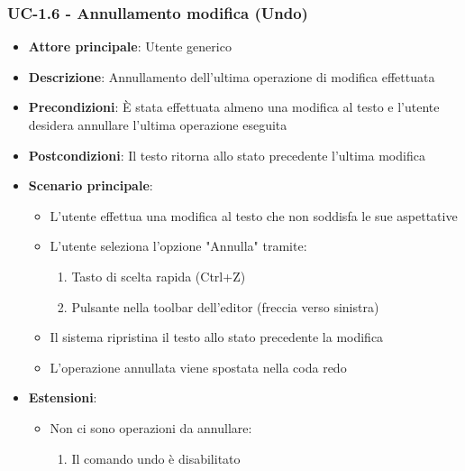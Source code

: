 \documentclass[11pt,a4paper]{article}
\begin{document}
\subsubsection{UC-1.6 - Annullamento modifica (Undo)}
\begin{itemize}
    \item \textbf{Attore principale}: Utente generico
    \item \textbf{Descrizione}: Annullamento dell'ultima operazione di modifica effettuata
    \item \textbf{Precondizioni}: È stata effettuata almeno una modifica al testo e l'utente desidera annullare l'ultima operazione eseguita
    \item \textbf{Postcondizioni}: Il testo ritorna allo stato precedente l'ultima modifica
    \item \textbf{Scenario principale}:
        \begin{itemize}
            \item L'utente effettua una modifica al testo che non soddisfa le sue aspettative
            \item L'utente seleziona l'opzione "Annulla" tramite:
                \begin{enumerate}
                    \item Tasto di scelta rapida (Ctrl+Z)
                    \item Pulsante nella toolbar dell'editor (freccia verso sinistra)
                \end{enumerate}
            \item Il sistema ripristina il testo allo stato precedente la modifica
            \item L'operazione annullata viene spostata nella coda redo
        \end{itemize}
    \item \textbf{Estensioni}:
        \begin{itemize}
            \item Non ci sono operazioni da annullare:
                \begin{enumerate}
                    \item Il comando undo è disabilitato
                \end{enumerate}
        \end{itemize}
\end{itemize}
\end{document}
